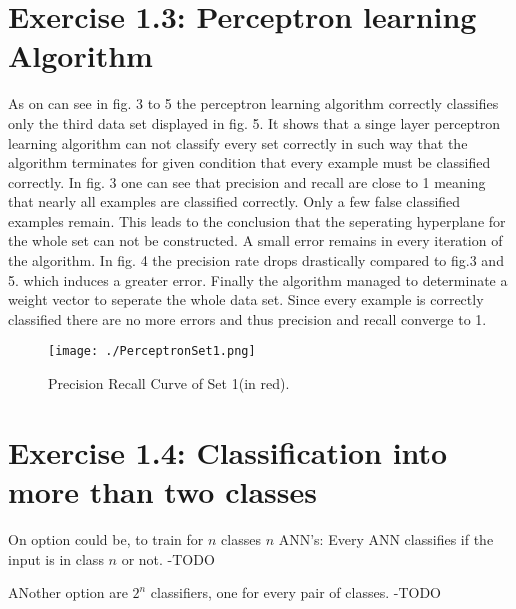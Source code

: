 \documentclass{scrartcl}
\begin{document}
\section{Exercise 1.3: Perceptron learning Algorithm}

As on can see in fig. 3 to 5 the perceptron learning algorithm correctly classifies only the third data set displayed in fig. 5. 
It shows that a singe layer perceptron learning algorithm can not classify every set correctly in such way that the algorithm terminates for given condition that every example must be classified correctly.
In fig. 3 one can see that precision and recall are close to 1 meaning that nearly all examples are classified correctly. Only a few false classified examples remain. This leads to the conclusion that the seperating hyperplane for the whole set can not be constructed.
A small error remains in every iteration of the algorithm. In fig. 4 the precision rate drops drastically compared to fig.3 and 5. which induces a greater error. Finally the algorithm managed to determinate a weight vector to seperate the whole data set.
Since every example is correctly classified there are no more errors and thus precision and recall converge to 1.

\begin{figure}[ht]
\begin{center}
\texttt{[image: ./PerceptronSet1.png]}
\end{center}
\caption{Precision Recall Curve of Set 1(in red).}
\label{Img:PrecisionRecallS1}
\end{figure}

\section{Exercise 1.4: Classification into more than two classes}
\begin{enumeration}
\item On option could be, to train for $n$ classes $n$ ANN's: Every ANN classifies if the input is in class $n$ or not. -TODO \\
\item ANother option are $2^n$ classifiers, one for every pair of classes. -TODO

\end{enumeration}
\end{document}
